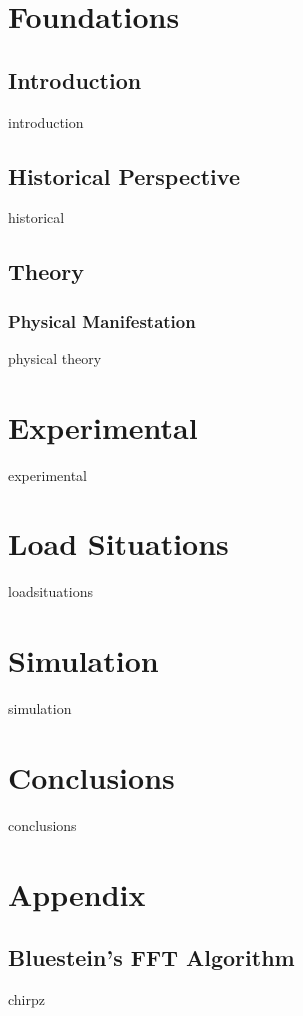 \documentclass[12pt,a4paper,titlepage,onecolumn]{report}
\begin{document}
\chapter{Foundations} \label{ch:qcmfoundations}
\section{Introduction}
{introduction}
\section{Historical Perspective}
{historical}
\section{Theory}
\subsection{Physical Manifestation}
{physical}
{theory}
\chapter{Experimental} \label{ch:qcmexperimental}
{experimental}
\chapter{Load Situations} \label{ch:qcmloadsituations}
{loadsituations}
\chapter{Simulation} \label{ch:qcmsimulation}
{simulation}
\chapter{Conclusions} \label{ch:qcmconclusions}
{conclusions}

\appendix
\chapter{Appendix}
\section{Bluestein's FFT Algorithm}
{chirpz}
\end{document}
